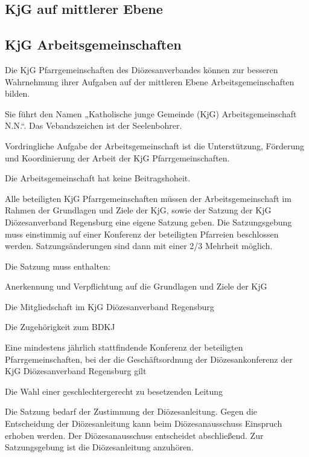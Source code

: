 \documentclass[12pt]{report}
\begin{document}
\begin{flushleft}
\chapter{KjG auf mittlerer Ebene}

\section{KjG Arbeitsgemeinschaften}

Die KjG Pfarrgemeinschaften des Diözesanverbandes können zur besseren Wahrnehmung ihrer
Aufgaben auf der mittleren Ebene Arbeitsgemeinschaften bilden.

Sie führt den Namen „Katholische junge Gemeinde (KjG) Arbeitsgemeinschaft N.N.“.
Das Vebandszeichen ist der Seelenbohrer.

Vordringliche Aufgabe der Arbeitsgemeinschaft ist die Unterstützung, Förderung und Koordinierung
der Arbeit der KjG Pfarrgemeinschaften.

Die Arbeitsgemeinschaft hat keine Beitragshoheit.

Alle beteiligten KjG Pfarrgemeinschaften müssen der Arbeitsgemeinschaft im Rahmen der Grundlagen
und Ziele der KjG, sowie der Satzung der KjG Diözesanverband Regensburg eine eigene
Satzung geben. Die Satzungsgebung muss einstimmig auf einer Konferenz der beteiligten Pfarreien
beschlossen werden. Satzungsänderungen sind dann mit einer 2/3 Mehrheit möglich.

Die Satzung muss enthalten:
\begin{itemize}
  \item Anerkennung und Verpflichtung auf die Grundlagen und Ziele der KjG
  \item Die Mitgliedschaft im KjG Diözesanverband Regensburg
  \item Die Zugehörigkeit zum BDKJ
  \item Eine mindestens jährlich stattfindende Konferenz der beteiligten Pfarrgemeinschaften, bei der
        die Geschäftsordnung der Diözesankonferenz der KjG Diözesanverband Regensburg gilt
  {\color{red}\item Die Wahl einer geschlechtergerecht zu besetzenden Leitung}
\end{itemize}

Die Satzung bedarf der Zustimmung der Diözesanleitung. Gegen die Entscheidung der Diözesanleitung
kann beim Diözesanausschuss Einspruch erhoben werden. Der Diözesanausschuss entscheidet
abschließend. Zur Satzungsgebung ist die Diözesanleitung
anzuhören.


\end{flushleft}
\end{document}
